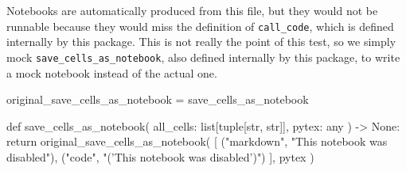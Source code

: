 \documentclass[oneside]{book}
\begin{document}
Notebooks are automatically produced from this file, but they would not be runnable because they would miss the definition of \texttt{call\_code}, which is defined internally by this package. This is not really the point of this test, so we simply mock \texttt{save\_cells\_as\_notebook}, also defined internally by this package, to write a mock notebook instead of the actual one.

\begin{pycell}
original_save_cells_as_notebook = save_cells_as_notebook

def save_cells_as_notebook(
    all_cells: list[tuple[str, str]], pytex: any
) -> None:
    return original_save_cells_as_notebook(
        [
            ("markdown", "This notebook was disabled"),
            ("code", "\nprint('This notebook was disabled')")
        ], pytex
    )
\end{pycell}
\end{document}

